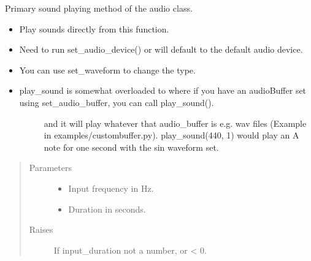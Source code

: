\documentclass[letterpaper,10pt,english,openany,oneside]{sphinxmanual}
\begin{document}
\begin{fulllineitems}
\begin{fulllineitems}
\end{fulllineitems}



\begin{fulllineitems}

\pysigstartsignatures
{}
\pysigstopsignatures
\sphinxAtStartPar
Primary sound playing method of the audio class.
\begin{itemize}
\item {} 
\sphinxAtStartPar
Play sounds directly from this function.

\item {} 
\sphinxAtStartPar
Need to run set\_audio\_device() or will default to the default audio device.

\item {} 
\sphinxAtStartPar
You can use set\_waveform to change the type.

\item {} \begin{description}
\item[{play\_sound is somewhat overloaded to where if you have an audioBuffer set using set\_audio\_buffer, you can call play\_sound().}] \leavevmode
\sphinxAtStartPar
and it will play whatever that audio\_buffer is e.g. wav files (Example in examples/custombuffer.py).
play\_sound(440, 1) would play an A note for one second with the sin waveform set.

\end{description}

\end{itemize}
\begin{quote}\begin{description}
\item[{Parameters}] \leavevmode\begin{itemize}
\item {} 
\sphinxAtStartPar
{} \textendash{} Input frequency in Hz.

\item {} 
\sphinxAtStartPar
{} \textendash{} Duration in seconds.

\end{itemize}

\item[{Raises}] \leavevmode
\sphinxAtStartPar
{} \textendash{} If input\_duration not a number, or \textless{} 0.


\end{description}
\end{quote}
\end{fulllineitems}
\end{fulllineitems}
\end{document}
